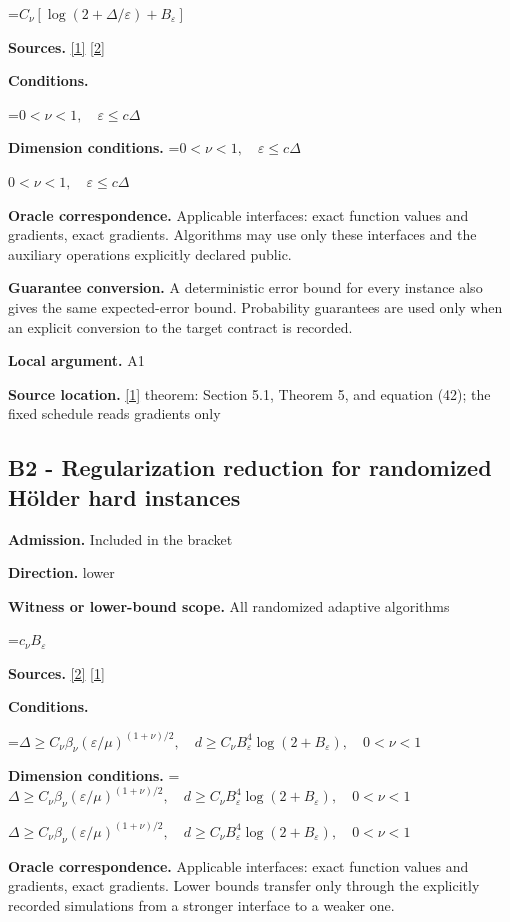\documentclass[10pt,a4paper]{article}
\newcommand{\AtlasMath}[1]{\par\begingroup\centering\setbox0=\hbox{$\displaystyle #1$}\ifdim\wd0>1.4\linewidth\typeout{ATLAS WIDE FORMULA: \the\wd0}\fi\ifdim\wd0>\linewidth\resizebox{\linewidth}{!}{\box0}\else\box0\fi\par\endgroup}
\newcommand{\AtlasInlineMath}[1]{\begingroup\setbox0=\hbox{$#1$}\ifdim\wd0>.4\linewidth\endgroup\AtlasMath{#1}\else\endgroup$#1$\fi}
\begin{document}
\AtlasMath{C_\nu[\log(2+\Delta/\varepsilon)+B_\varepsilon]}
\textbf{Sources.} \href{https://optimization-online.org/wp-content/uploads/2010/12/2865.pdf}{[1]} \href{https://proceedings.mlr.press/v99/diakonikolas19c/diakonikolas19c.pdf}{[2]}

\textbf{Conditions.} 
\AtlasMath{0<\nu<1,\quad\varepsilon\le c\Delta}


\textbf{Dimension conditions.} \AtlasInlineMath{0<\nu<1,\quad\varepsilon\le c\Delta}

\textbf{Oracle correspondence.} Applicable interfaces: exact function values and gradients, exact gradients. Algorithms may use only these interfaces and the auxiliary operations explicitly declared public.

\textbf{Guarantee conversion.} A deterministic error bound for every instance also gives the same expected-error bound. Probability guarantees are used only when an explicit conversion to the target contract is recorded.

\textbf{Local argument.} A1

\textbf{Source location.} \href{https://optimization-online.org/wp-content/uploads/2010/12/2865.pdf}{[1]} theorem: Section 5.1, Theorem 5, and equation (42); the fixed schedule reads gradients only

\subsection{B2 - Regularization reduction for randomized Hölder hard instances}
\textbf{Admission.} Included in the bracket

\textbf{Direction.} lower

\textbf{Witness or lower-bound scope.} All randomized adaptive algorithms

\AtlasMath{c_\nu B_\varepsilon}
\textbf{Sources.} \href{https://proceedings.mlr.press/v99/diakonikolas19c/diakonikolas19c.pdf}{[2]} \href{https://optimization-online.org/wp-content/uploads/2010/12/2865.pdf}{[1]}

\textbf{Conditions.} 
\AtlasMath{\Delta\ge C_\nu\beta_\nu(\varepsilon/\mu)^{(1+\nu)/2},\quad d\ge C_\nu B_\varepsilon^4\log(2+B_\varepsilon),\quad0<\nu<1}


\textbf{Dimension conditions.} \AtlasInlineMath{\Delta\ge C_\nu\beta_\nu(\varepsilon/\mu)^{(1+\nu)/2},\quad d\ge C_\nu B_\varepsilon^4\log(2+B_\varepsilon),\quad0<\nu<1}

\textbf{Oracle correspondence.} Applicable interfaces: exact function values and gradients, exact gradients. Lower bounds transfer only through the explicitly recorded simulations from a stronger interface to a weaker one.
\end{document}
